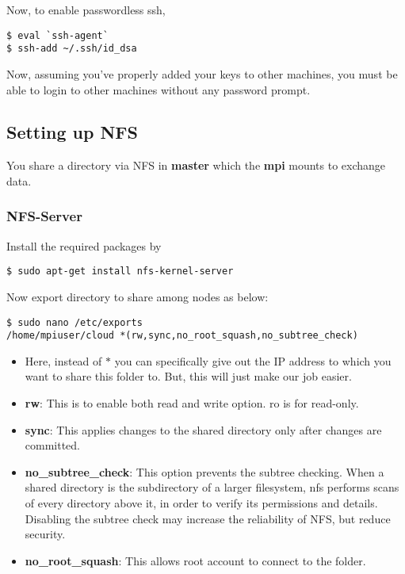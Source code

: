 \documentclass[paper=letter, fontsize=12pt]{article}
\begin{document}
Now, to enable passwordless ssh,

\begin{verbatim}
$ eval `ssh-agent`
$ ssh-add ~/.ssh/id_dsa
\end{verbatim}

Now, assuming you’ve properly added your keys to other machines, you must be able to login to other machines without any password prompt.


\subsection{Setting up NFS}
You share a directory via NFS in \textbf{master} which the \textbf{mpi} mounts to exchange data.

\subsubsection{NFS-Server}
Install the required packages by
\begin{verbatim}
$ sudo apt-get install nfs-kernel-server
\end{verbatim}

Now export directory to share among nodes as below:
\begin{verbatim}
$ sudo nano /etc/exports
/home/mpiuser/cloud *(rw,sync,no_root_squash,no_subtree_check)
\end{verbatim}

\begin{itemize}
    \item Here, instead of $ * $ you can specifically give out the IP address to which you want to share this folder to. But, this will just make our job easier.
    
    \item \textbf{rw}: This is to enable both read and write option. ro is for read-only.
    \item \textbf{sync}: This applies changes to the shared directory only after changes are committed.
    \item \textbf{no\_subtree\_check}: This option prevents the subtree checking. When a shared directory is the subdirectory of a larger filesystem, nfs performs scans of every directory above it, in order to verify its permissions and details. Disabling the subtree check may increase the reliability of NFS, but reduce security.
    \item \textbf{no\_root\_squash}: This allows root account to connect to the folder.
\end{itemize}
\end{document}
